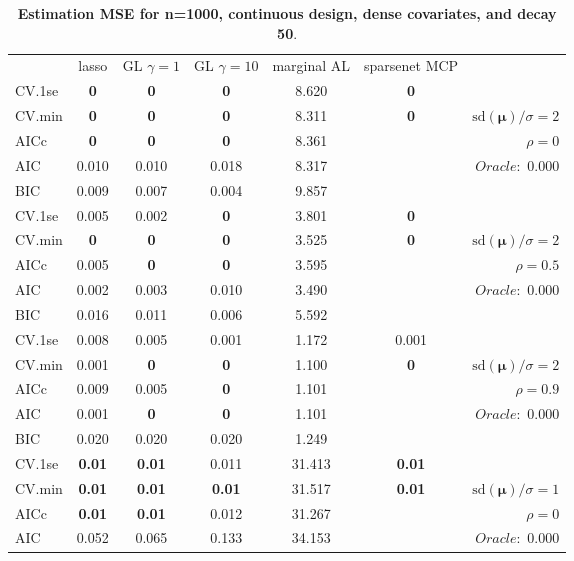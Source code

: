 \clearpage
\begin{table}\vspace{-.5cm}
\caption[l]{ { \bf Estimation MSE for n=1000, continuous design, 
dense covariates, and  decay  50}.}
\vspace{-.5cm}
\footnotesize{}
\begin{center}
\begin{tabular}{l*{5}{c}|r}
& lasso & GL $\gamma=1$ & GL $\gamma=10$ & marginal AL & sparsenet MCP  & \\
 \cline{1-7}
CV.1se & {\bf 0} & {\bf 0} & {\bf 0} & 8.620 & {\bf 0} & \\
CV.min & {\bf 0} & {\bf 0} & {\bf 0} & 8.311 & {\bf 0} &  $\mathrm{sd}(\mathbf{\mu})/\sigma=2$ \\
AICc & {\bf 0} & {\bf 0} & {\bf 0} & 8.361 & & $\rho=0$ \\
AIC & 0.010 & 0.010 & 0.018 & 8.317 & &  \multirow{2}{*}{$Oracle: $ 0.000} \\
BIC & 0.009 & 0.007 & 0.004 & 9.857 & &  \\
 \hline 
CV.1se & 0.005 & 0.002 & {\bf 0} & 3.801 & {\bf 0} & \\
CV.min & {\bf 0} & {\bf 0} & {\bf 0} & 3.525 & {\bf 0} &  $\mathrm{sd}(\mathbf{\mu})/\sigma=2$ \\
AICc & 0.005 & {\bf 0} & {\bf 0} & 3.595 & & $\rho=0.5$ \\
AIC & 0.002 & 0.003 & 0.010 & 3.490 & &  \multirow{2}{*}{$Oracle: $ 0.000} \\
BIC & 0.016 & 0.011 & 0.006 & 5.592 & &  \\
 \hline 
CV.1se & 0.008 & 0.005 & 0.001 & 1.172 & 0.001 & \\
CV.min & 0.001 & {\bf 0} & {\bf 0} & 1.100 & {\bf 0} &  $\mathrm{sd}(\mathbf{\mu})/\sigma=2$ \\
AICc & 0.009 & 0.005 & {\bf 0} & 1.101 & & $\rho=0.9$ \\
AIC & 0.001 & {\bf 0} & {\bf 0} & 1.101 & &  \multirow{2}{*}{$Oracle: $ 0.000} \\
BIC & 0.020 & 0.020 & 0.020 & 1.249 & &  \\
 \hline 
CV.1se & {\bf 0.01} & {\bf 0.01} & 0.011 & 31.413 & {\bf 0.01} & \\
CV.min & {\bf 0.01} & {\bf 0.01} & {\bf 0.01} & 31.517 & {\bf 0.01} &  $\mathrm{sd}(\mathbf{\mu})/\sigma=1$ \\
AICc & {\bf 0.01} & {\bf 0.01} & 0.012 & 31.267 & & $\rho=0$ \\
AIC & 0.052 & 0.065 & 0.133 & 34.153 & &  \multirow{2}{*}{$Oracle: $ 0.000} \\

\end{tabular}
\end{center}
\end{table}

